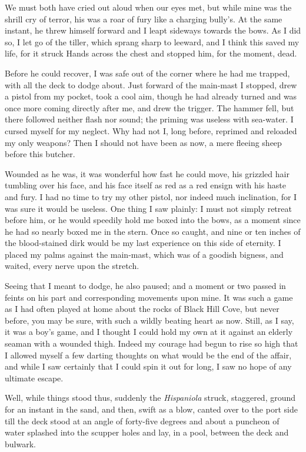 We must both have cried out aloud when our eyes met, but while mine was the shrill cry of terror, his was a roar of fury like a charging bully’s. At the same instant, he threw himself forward and I leapt sideways towards the bows. As I did so, I let go of the tiller, which sprang sharp to leeward, and I think this saved my life, for it struck Hands across the chest and stopped him, for the moment, dead.

Before he could recover, I was safe out of the corner where he had me trapped, with all the deck to dodge about. Just forward of the main-mast I stopped, drew a pistol from my pocket, took a cool aim, though he had already turned and was once more coming directly after me, and drew the trigger. The hammer fell, but there followed neither flash nor sound; the priming was useless with sea-water. I cursed myself for my neglect. Why had not I, long before, reprimed and reloaded my only weapons? Then I should not have been as now, a mere fleeing sheep before this butcher.

Wounded as he was, it was wonderful how fast he could move, his grizzled hair tumbling over his face, and his face itself as red as a red ensign with his haste and fury. I had no time to try my other pistol, nor indeed much inclination, for I was sure it would be useless. One thing I saw plainly: I must not simply retreat before him, or he would speedily hold me boxed into the bows, as a moment since he had so nearly boxed me in the stern. Once so caught, and nine or ten inches of the blood-stained dirk would be my last experience on this side of eternity. I placed my palms against the main-mast, which was of a goodish bigness, and waited, every nerve upon the stretch.

Seeing that I meant to dodge, he also paused; and a moment or two passed in feints on his part and corresponding movements upon mine. It was such a game as I had often played at home about the rocks of Black Hill Cove, but never before, you may be sure, with such a wildly beating heart as now. Still, as I say, it was a boy’s game, and I thought I could hold my own at it against an elderly seaman with a wounded thigh. Indeed my courage had begun to rise so high that I allowed myself a few darting thoughts on what would be the end of the affair, and while I saw certainly that I could spin it out for long, I saw no hope of any ultimate escape.

Well, while things stood thus, suddenly the \textit{Hispaniola} struck, staggered, ground for an instant in the sand, and then, swift as a blow, canted over to the port side till the deck stood at an angle of forty-five degrees and about a puncheon of water splashed into the scupper holes and lay, in a pool, between the deck and bulwark.

